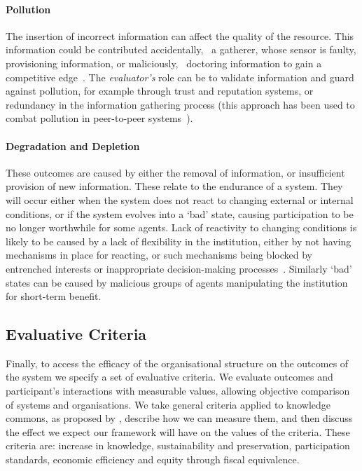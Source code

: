 
\paragraph{Pollution}
The insertion of incorrect information can affect the quality of the resource. 
This information could be contributed accidentally, \eg\ a gatherer, whose sensor is faulty, provisioning information, or maliciously, \eg\ doctoring information to gain a competitive edge~\citep{Oreskes2010}. 
The \emph{evaluator's} role can be to validate information and guard against pollution,
for example through trust and reputation systems, or redundancy in the information gathering process (this approach has been used to combat pollution in peer-to-peer systems~\citep{Kamvar2003,Costa2007}).

\paragraph{Degradation and Depletion}
These outcomes are caused by either the removal of information, or insufficient provision of new information. 
These relate to the endurance of a system. They will occur either when the system does not react to changing external or internal conditions,  or if the system evolves into a `bad' state, causing participation to be no longer worthwhile for some agents. 
Lack of reactivity to changing conditions is likely to be caused by a lack of flexibility in the institution, either by not having mechanisms in place for reacting, or such mechanisms being blocked by entrenched interests or inappropriate decision-making processes~\citep{North1990}. 
Similarly `bad' states can be caused by malicious groups of agents manipulating the institution for short-term benefit.

\subsection{Evaluative Criteria}

Finally, to access the efficacy of the organisational structure on the outcomes of the system we specify a set of evaluative criteria. 
We evaluate outcomes and participant's interactions with measurable values, allowing objective comparison of systems and organisations. 
We take general criteria applied to knowledge commons, as proposed by , describe how we can measure them, and then discuss the effect we expect our framework will have on the values of the criteria. 
These criteria are: increase in knowledge, sustainability and preservation, participation standards, economic efficiency and equity through fiscal equivalence.

